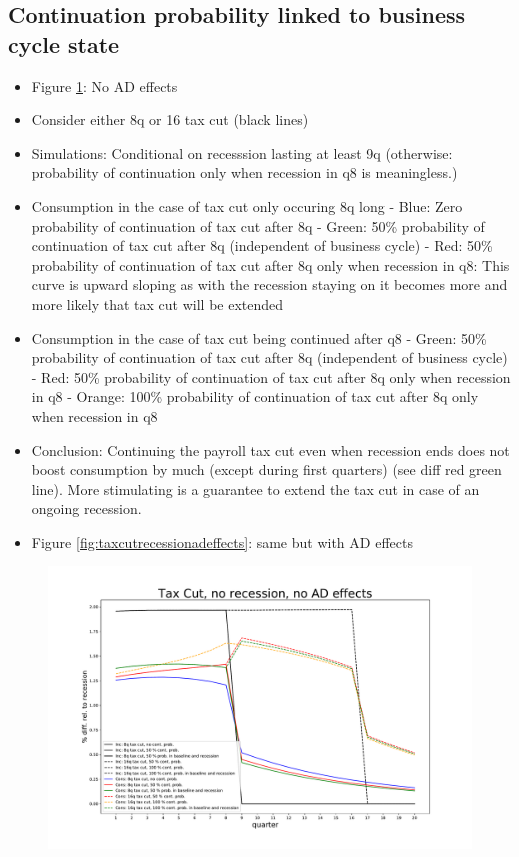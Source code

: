 \documentclass[]{article}
\begin{document}
\subsection{Continuation probability linked to business cycle state}
\begin{itemize}
	\item Figure \ref{fig:taxcutrecessionnoadeffects}: No AD effects
	\item Consider either 8q or 16 tax cut (black lines)
	\item Simulations: Conditional on recesssion lasting at least 9q (otherwise: probability of continuation only when recession in q8 is meaningless.)
	\item Consumption in the case of tax cut only occuring 8q long
	\subitem - Blue:  Zero probability of continuation of tax cut after 8q
	\subitem - Green: 50\% probability of continuation of tax cut after 8q (independent of business cycle)
	\subitem - Red:   50\% probability of continuation of tax cut after 8q only when recession in q8: This curve is upward sloping as with the recession staying on it becomes more and more likely that tax cut will be extended
	\item Consumption in the case of tax cut being continued after q8
	\subitem - Green:  50\% probability of continuation of tax cut after 8q (independent of business cycle)
	\subitem - Red:    50\% probability of continuation of tax cut after 8q only when recession in q8
	\subitem - Orange: 100\% probability of continuation of tax cut after 8q only when recession in q8
	\item Conclusion: Continuing the payroll tax cut even when recession ends does not boost consumption by much (except during first quarters) (see diff red green line). More stimulating is a guarantee to extend the tax cut in case of an ongoing recession.
	\item Figure \ref{fig:taxcutrecessionadeffects}: same but with AD effects
\end{itemize}
	
\begin{figure}
	\includegraphics[width=1\linewidth]{../Continuation_Prob_Experiments/tax_cut_recession_no_AD_effects}
	\caption{}
	\label{fig:taxcutrecessionnoadeffects}
\end{figure}
	
\end{document}
